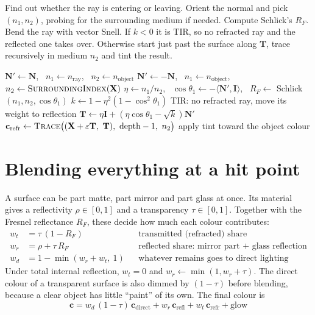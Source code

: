 \documentclass[11pt,a4paper]{article}
\newcommand{\vv}[1]{\mathbf{#1}}
\newcommand{\dotp}[2]{\langle #1, #2\rangle}
\begin{document}
\begin{inshort}
Find out whether the ray is entering or leaving. Orient the normal and pick
$(n_1,n_2)$, probing for the surrounding medium if needed. Compute Schlick's
$R_F$. Bend the ray with vector Snell. If $k<0$ it is TIR, so no refracted ray
and the reflected one takes over. Otherwise start just past the surface along
$\vv T$, trace recursively in medium $n_2$ and tint the result.
\end{inshort}

\begin{algorithm}[h]
\caption{Refracted ray}
\begin{algorithmic}[1]
\If{$\dotp{\vv N}{\vv I}<0$} 
  \State $\vv N'\gets\vv N$, \ $n_1\gets n_{\text{ray}}$, \ $n_2\gets n_{\text{object}}$
\Else {}
  \State $\vv N'\gets-\vv N$, \ $n_1\gets n_{\text{object}}$, \ $n_2\gets \textsc{SurroundingIndex}(\vv X)$
\EndIf
\State $\eta\gets n_1/n_2$, \ $\cos\theta_1\gets-\dotp{\vv N'}{\vv I}$, \ $R_F\gets$ Schlick$(n_1,n_2,\cos\theta_1)$
\State $k\gets1-\eta^2(1-\cos^2\theta_1)$
 \State TIR: no refracted ray, move its weight to reflection
\Else
  \State $\vv T\gets \eta\vv I+(\eta\cos\theta_1-\sqrt k)\vv N'$
  \State $\vv c_{\text{refr}}\gets\textsc{Trace}\big((\vv X+\varepsilon\vv T,\ \vv T),\ \text{depth}-1,\ n_2\big)$
  \State apply tint toward the object colour
\EndIf
\end{algorithmic}
\end{algorithm}

\section{Blending everything at a hit point}

A surface can be part matte, part mirror and part glass at once. Its material
gives a reflectivity $\rho\in[0,1]$ and a transparency $\tau\in[0,1]$. Together
with the Fresnel reflectance $R_F$, these decide how much each colour
contributes:
\begin{align*}
  w_t &= \tau\,(1-R_F) && \text{transmitted (refracted) share}\\
  w_r &= \rho + \tau\,R_F && \text{reflected share: mirror part + glass reflection}\\
  w_d &= 1-\min(w_r+w_t,\ 1) && \text{whatever remains goes to direct lighting}
\end{align*}
Under total internal reflection, $w_t=0$ and $w_r\leftarrow\min(1,w_r+\tau)$.
The direct colour of a transparent surface is also dimmed by $(1-\tau)$ before
blending, because a clear object has little ``paint'' of its own. The final
colour is
\[
  \boxed{\ \vv c = w_d\,(1-\tau)\,\vv c_{\text{direct}} + w_r\,\vv c_{\text{refl}} + w_t\,\vv c_{\text{refr}} + \text{glow}\ }
\]
\end{document}
